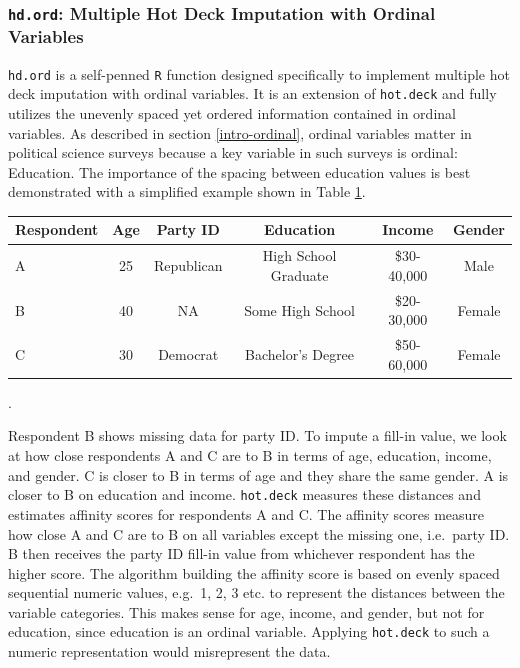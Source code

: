 \documentclass[12pt,econ]{sources/authesis}
\makeatletter
\def\caption{\refstepcounter\@captype \@dblarg{\@caption\@captype}}
\makeatother
\begin{document}
\hypertarget{ordmiss-theory-multimpute-hdord}{%
\subsubsection{\texorpdfstring{\texttt{hd.ord}: Multiple Hot Deck Imputation with Ordinal Variables}{hd.ord: Multiple Hot Deck Imputation with Ordinal Variables}}\label{ordmiss-theory-multimpute-hdord}}

\texttt{hd.ord} is a self-penned \texttt{R} function designed specifically to implement multiple hot deck imputation with ordinal variables. It is an extension of \texttt{hot.deck} and fully utilizes the unevenly spaced yet ordered information contained in ordinal variables. As described in section \ref{intro-ordinal}, ordinal variables matter in political science surveys because a key variable in such surveys is ordinal: Education. The importance of the spacing between education values is best demonstrated with a simplified example shown in Table \ref{ordmiss-ordspace}.
\begin{table}[ht]
  \centering
  \begin{tabular}{lccccc}
  \bottomrule 
  \midrule
  Respondent & Age & Party ID & Education & Income & Gender\\
  \hline
  A & 25 & Republican & High School Graduate & \$30-40,000 & Male \\
  B & 40 & NA & Some High School &  \$20-30,000 & Female\\
  C & 30 & Democrat & Bachelor's Degree &  \$50-60,000 & Female\\
  \bottomrule 
  \end{tabular}
  \caption{Illustrative Data}.
  \label{ordmiss-ordspace}
\end{table}
Respondent B shows missing data for party ID. To impute a fill-in value, we look at how close respondents A and C are to B in terms of age, education, income, and gender. C is closer to B in terms of age and they share the same gender. A is closer to B on education and income. \texttt{hot.deck} measures these distances and estimates affinity scores for respondents A and C. The affinity scores measure how close A and C are to B on all variables except the missing one, i.e.~party ID. B then receives the party ID fill-in value from whichever respondent has the higher score. The algorithm building the affinity score is based on evenly spaced sequential numeric values, e.g.~1, 2, 3 etc. to represent the distances between the variable categories. This makes sense for age, income, and gender, but not for education, since education is an ordinal variable. Applying \texttt{hot.deck} to such a numeric representation would misrepresent the data.
\end{document}
